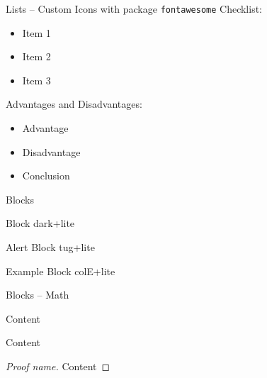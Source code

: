 \documentclass[table, aspectratio=169]{beamer}
\begin{document}
\newcommand{\checkyes}{\textcolor{tuggreen}{\faCheckSquareO}}
\newcommand{\checkno}{\textcolor{black}{\faSquareO\,}}
\begin{frame}[fragile]{Lists -- Custom Icons with package \texttt{fontawesome}}
  Checklist:
  \begin{itemize}
    \item[\checkyes] Item 1
    \item[\checkyes] Item 2
    \item[\checkno] Item 3
  \end{itemize}
  Advantages and Disadvantages:
  \begin{itemize}
    \item[\textcolor{tuggreen}{\faPlusCircle}] Advantage
    \item[\textcolor{tugred}{\faMinusCircle}]  Disadvantage
    \item[\textcolor{tugblue}{\faArrowCircleRight}] Conclusion
  \end{itemize}
\end{frame}

\begin{frame}{Blocks}
  \begin{block}{Block}
    dark+lite
  \end{block}
  \begin{alertblock}{Alert Block}
    tug+lite
  \end{alertblock}
  \begin{exampleblock}{Example Block}
    colE+lite
  \end{exampleblock}
\end{frame}

\begin{frame}{Blocks -- Math}
  \begin{theorem}
    Content
  \end{theorem}
  \begin{example}
    Content
  \end{example}
  \begin{proof}[Proof name]
    Content
  \end{proof}
\end{frame}
\end{document}
